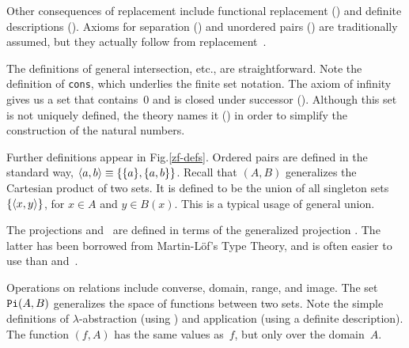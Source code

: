 Other consequences of replacement include functional replacement
() and definite descriptions ().
Axioms for separation () and unordered pairs
() are traditionally assumed, but they actually follow
from replacement~\cite[pages 237--8]{suppes72}.

The definitions of general intersection, etc., are straightforward.  Note
the definition of {\tt cons}, which underlies the finite set notation.
The axiom of infinity gives us a set that contains~0 and is closed under
successor ().  Although this set is not uniquely defined,
the theory names it () in order to simplify the
construction of the natural numbers.
                                             
Further definitions appear in Fig.\ts\ref{zf-defs}.  Ordered pairs are
defined in the standard way, $\langle a,b\rangle\equiv\{\{a\},\{a,b\}\}$.  Recall
that $(A,B)$ generalizes the Cartesian product of two
sets.  It is defined to be the union of all singleton sets
$\{\langle x,y\rangle\}$, for $x\in A$ and $y\in B(x)$.  This is a typical usage of
general union.

The projections  and~ are defined in terms of the
generalized projection .  The latter has been borrowed from
Martin-L\"of's Type Theory, and is often easier to use than 
and~.

Operations on relations include converse, domain, range, and image.  The
set ${\tt Pi}(A,B)$ generalizes the space of functions between two sets.
Note the simple definitions of $\lambda$-abstraction (using
) and application (using a definite description).  The
function $(f,A)$ has the same values as~$f$, but only
over the domain~$A$.



